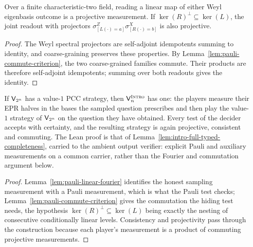 \effortHard

\begin{lemma}
\label{lem:intro-linear-readout-projectivity}
\leanok
Over a finite characteristic-two field, reading a linear map of either Weyl
eigenbasis outcome is a projective measurement. If
$\ker(R)^\perp\subseteq\ker(L)$, the joint readout with projectors
$\sigma^Z_{[L(\cdot)=a]}\sigma^X_{[R(\cdot)=b]}$ is also projective.
\end{lemma}
\begin{proof}
\leanok
The Weyl spectral projectors are self-adjoint idempotents summing to identity,
and coarse-graining preserves these properties. By
Lemma~\ref{lem:pauli-commute-criterion}, the two coarse-grained families commute.
Their products are therefore self-adjoint idempotents; summing over both
readouts gives the identity.
\end{proof}

\begin{lemma}
\label{lem:intro-completeness}
\leanok
If $\mathsf{V}_{2^n}$ has a value-$1$ PCC strategy, then $\mathsf{V}^{\textsc{Intro}}_n$ has one: the players
measure their EPR halves in the bases the sampled question prescribes and then play the
value-$1$ strategy of $\mathsf{V}_{2^n}$ on the question they have obtained. Every test of the
decider accepts with certainty, and the resulting strategy is again projective, consistent
and commuting.
The Lean proof is that of Lemma~\ref{lem:intro-full-typed-completeness}, carried to the
ambient output verifier: explicit Pauli and auxiliary measurements on a common carrier,
rather than the Fourier and commutation argument below.
\end{lemma}

\begin{proof}
\leanok
{}
Lemma~\ref{lem:pauli-linear-fourier} identifies the honest sampling measurement with a Pauli
measurement, which is what the Pauli test checks; Lemma~\ref{lem:pauli-commute-criterion}
gives the commutation the hiding test needs, the hypothesis
$\ker(R)^\perp \subseteq \ker(L)$ being exactly the nesting of consecutive conditionally
linear levels. Consistency and projectivity pass through the construction because each
player's measurement is a product of commuting projective measurements.
\end{proof}

